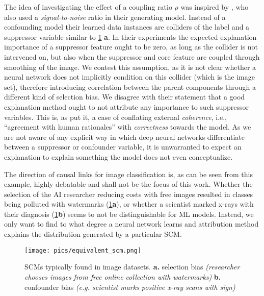 The idea of investigating the effect of a coupling ratio $\rho$ was inspired by \citet{Clark2023}, who also used a \textit{signal-to-noise} ratio in their generating model. Instead of a confounding model their learned data instances are colliders of the label and a suppressor variable similar to \cref{fig:equivalent_scm} \textbf{a}. In their experiments the expected explanation importance of a suppressor feature ought to be zero, as long as the collider is not intervened on, but also when the suppressor and core feature are coupled through smoothing of the image. We contest this assumption, as it is not clear whether a neural network does not implicitly condition on this collider (which is the image set), therefore introducing correlation between the parent components through a different kind of selection bias. We disagree with their statement that a good explanation method ought to not attribute any importance to such suppressor variables. This is, as  \citet{Nauta2023} put it, a case of conflating external \textit{coherence}, i.e., ``agreement with human rationales'' \citep{Atanasova2020} with \textit{correctness} towards the model. As we are not aware of any explicit way in which deep neural networks differentiate between a suppressor or confounder variable, it is unwarranted to expect an explanation to explain something the model does not even conceptualize. 

The direction of causal links for image classification is, as can be seen from this example, highly debatable and shall not be the focus of this work. Whether the selection of the AI researcher reducing costs with free images resulted in classes being polluted with watermarks (\cref{fig:equivalent_scm}\textbf{a}), or whether a scientist marked x-rays with their diagnosis (\cref{fig:equivalent_scm}\textbf{b}) seems to not be distinguishable for ML models. 
Instead, we only want to find to what degree a neural network learns and attribution method explains the distribution generated by a particular SCM.



\begin{figure}[t!]
    \centering
    \texttt{[image: pics/equivalent\_scm.png]}
    \caption[Selection vs. Confounder Bias]{SCMs typically found in image datasets.
    \textbf{a.} selection bias \textit{(researcher chooses images from free online collection with watermarks)}
    \textbf{b.} confounder bias \textit{(e.g. scientist marks positive x-ray scans with sign)}}
    \label{fig:equivalent_scm}
\end{figure}

